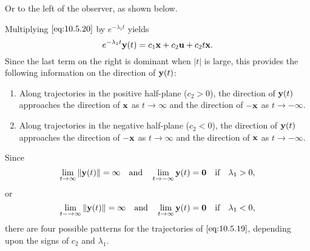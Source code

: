 \documentclass{ximera}
\begin{document}



Or to the left of the observer, as shown below.

\begin{center}
\end{center}

\begin{center}
\end{center}



Multiplying $\eqref{eq:10.5.20}$ by $e^{-\lambda_1t}$ yields
$$
e^{-\lambda_1t}{\bf y}(t)=c_1{\bf x}+c_2{\bf u}+c_2t
{\bf x}.
$$
Since the last term on the right is dominant when $|t|$ is large,
this provides the following information on the direction of ${\bf
y}(t)$:
\begin{enumerate}
\item %
Along trajectories in the positive half-plane ($c_2>0$), the direction
of ${\bf y}(t)$ approaches the direction of ${\bf x}$ as $t\rightarrow\infty$
and the direction of $-{\bf x}$ as $t\rightarrow-\infty$.
\item %
Along trajectories in the negative half-plane ($c_2<0$), the direction
of ${\bf y}(t)$ approaches the direction of $-{\bf x}$ as $t\rightarrow\infty$
and the direction of ${\bf x}$ as $t\rightarrow-\infty$.
\end{enumerate}

Since
$$
\lim_{t\rightarrow\infty}\|{\bf y}(t)\|=\infty\quad\mbox{and}\quad
\lim_{t\rightarrow-\infty}{\bf y}(t)={\bf 0}\quad\mbox{if}\quad\lambda_1>0,
$$
or
$$
\lim_{t-\rightarrow\infty}\|{\bf y}(t)\|=\infty\quad\mbox{and}\quad
\lim_{t\rightarrow\infty}{\bf y}(t)={\bf 0}\quad\mbox{if}\quad\lambda_1<0,
$$
 there are four possible patterns for the trajectories
of $\eqref{eq:10.5.19}$, depending upon the signs of $c_2$ and $\lambda_1$.

\end{document}
